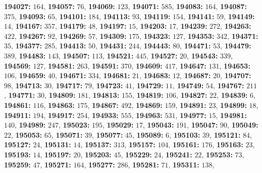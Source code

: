 \textsf{\bfseries 194027:} $164$, \textsf{\bfseries 194057:} $76$, \textsf{\bfseries 194069:} $123$, \textsf{\bfseries 194071:} $585$, \textsf{\bfseries 194083:} $164$, \textsf{\bfseries 194087:} $375$, \textsf{\bfseries 194093:} $65$, \textsf{\bfseries 194101:} $184$, \textsf{\bfseries 194113:} $93$, \textsf{\bfseries 194119:} $154$, \textsf{\bfseries 194141:} $59$, \textsf{\bfseries 194149:} $14$, \textsf{\bfseries 194167:} $357$, \textsf{\bfseries 194179:} $48$, \textsf{\bfseries 194197:} $15$, \textsf{\bfseries 194203:} $17$, \textsf{\bfseries 194239:} $272$, \textsf{\bfseries 194263:} $422$, \textsf{\bfseries 194267:} $92$, \textsf{\bfseries 194269:} $57$, \textsf{\bfseries 194309:} $175$, \textsf{\bfseries 194323:} $127$, \textsf{\bfseries 194353:} $342$, \textsf{\bfseries 194371:} $35$, \textsf{\bfseries 194377:} $285$, \textsf{\bfseries 194413:} $50$, \textsf{\bfseries 194431:} $244$, \textsf{\bfseries 194443:} $80$, \textsf{\bfseries 194471:} $53$, \textsf{\bfseries 194479:} $389$, \textsf{\bfseries 194483:} $143$, \textsf{\bfseries 194507:} $113$, \textsf{\bfseries 194521:} $445$, \textsf{\bfseries 194527:} $20$, \textsf{\bfseries 194543:} $339$, \textsf{\bfseries 194569:} $127$, \textsf{\bfseries 194581:} $263$, \textsf{\bfseries 194591:} $370$, \textsf{\bfseries 194609:} $417$, \textsf{\bfseries 194647:} $131$, \textsf{\bfseries 194653:} $106$, \textsf{\bfseries 194659:} $40$, \textsf{\bfseries 194671:} $334$, \textsf{\bfseries 194681:} $21$, \textsf{\bfseries 194683:} $12$, \textsf{\bfseries 194687:} $20$, \textsf{\bfseries 194707:} $98$, \textsf{\bfseries 194713:} $30$, \textsf{\bfseries 194717:} $79$, \textsf{\bfseries 194723:} $41$, \textsf{\bfseries 194729:} $11$, \textsf{\bfseries 194749:} $54$, \textsf{\bfseries 194767:} $211$, \textsf{\bfseries 194771:} $30$, \textsf{\bfseries 194809:} $181$, \textsf{\bfseries 194813:} $155$, \textsf{\bfseries 194819:} $106$, \textsf{\bfseries 194827:} $22$, \textsf{\bfseries 194839:} $6$, \textsf{\bfseries 194861:} $116$, \textsf{\bfseries 194863:} $175$, \textsf{\bfseries 194867:} $492$, \textsf{\bfseries 194869:} $159$, \textsf{\bfseries 194891:} $23$, \textsf{\bfseries 194899:} $18$, \textsf{\bfseries 194911:} $194$, \textsf{\bfseries 194917:} $254$, \textsf{\bfseries 194933:} $555$, \textsf{\bfseries 194963:} $531$, \textsf{\bfseries 194977:} $15$, \textsf{\bfseries 194981:} $140$, \textsf{\bfseries 194989:} $247$, \textsf{\bfseries 195023:} $195$, \textsf{\bfseries 195029:} $17$, \textsf{\bfseries 195043:} $191$, \textsf{\bfseries 195047:} $90$, \textsf{\bfseries 195049:} $22$, \textsf{\bfseries 195053:} $65$, \textsf{\bfseries 195071:} $39$, \textsf{\bfseries 195077:} $45$, \textsf{\bfseries 195089:} $6$, \textsf{\bfseries 195103:} $39$, \textsf{\bfseries 195121:} $84$, \textsf{\bfseries 195127:} $24$, \textsf{\bfseries 195131:} $14$, \textsf{\bfseries 195137:} $313$, \textsf{\bfseries 195157:} $104$, \textsf{\bfseries 195161:} $176$, \textsf{\bfseries 195163:} $23$, \textsf{\bfseries 195193:} $14$, \textsf{\bfseries 195197:} $20$, \textsf{\bfseries 195203:} $45$, \textsf{\bfseries 195229:} $24$, \textsf{\bfseries 195241:} $22$, \textsf{\bfseries 195253:} $73$, \textsf{\bfseries 195259:} $47$, \textsf{\bfseries 195271:} $164$, \textsf{\bfseries 195277:} $286$, \textsf{\bfseries 195281:} $71$, \textsf{\bfseries 195311:} $138$, 
